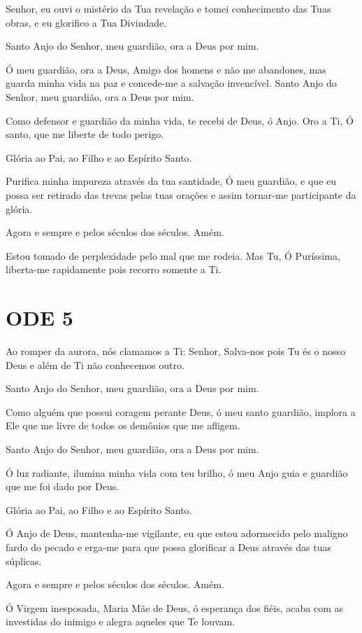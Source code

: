 \documentclass{subfiles}
\begin{document}
\eirmos{}Senhor, eu ouvi o mistério da Tua revelação e tomei conhecimento das
Tuas obras, e eu glorifico a Tua Divindade.

Santo Anjo do Senhor, meu guardião, ora a Deus por mim.

Ó meu guardião, ora a Deus, Amigo dos homens e não me abandones,
mas guarda minha vida na paz e concede-me a salvação invencível.
Santo Anjo do Senhor, meu guardião, ora a Deus por mim.

Como defensor e guardião da minha vida, te recebi de Deus, ó Anjo.
Oro a Ti, Ó santo, que me liberte de todo perigo.

Glória ao Pai, ao Filho e ao Espírito Santo.

Purifica minha impureza através da tua santidade, Ó meu guardião, e
que eu possa ser retirado das trevas pelas tuas orações e assim tornar-me
participante da glória.

Agora e sempre e pelos séculos dos séculos. Amém.

Estou tomado de perplexidade pelo mal que me rodeia. Mas Tu, Ó
Puríssima, liberta-me rapidamente pois recorro somente a Ti.

\section*{ODE 5}

\eirmos{}Ao romper da aurora, nós clamamos a Ti: Senhor, Salva-nos pois Tu és
o nosso Deus e além de Ti não conhecemos outro.

Santo Anjo do Senhor, meu guardião, ora a Deus por mim.

Como alguém que possui coragem perante Deus, ó meu santo
guardião, implora a Ele que me livre de todos os demônios que me afligem.

Santo Anjo do Senhor, meu guardião, ora a Deus por mim.

Ó luz radiante, ilumina minha vida com teu brilho, ó meu Anjo guia e
guardião que me foi dado por Deus.

Glória ao Pai, ao Filho e ao Espírito Santo.

Ó Anjo de Deus, mantenha-me vigilante, eu que estou adormecido
pelo maligno fardo do pecado e erga-me para que possa glorificar a Deus
através das tuas súplicas.

Agora e sempre e pelos séculos dos séculos. Amém.

Ó Virgem inesposada, Maria Mãe de Deus, ó esperança dos fiéis, acaba
com as investidas do inimigo e alegra aqueles que Te louvam.
\end{document}
